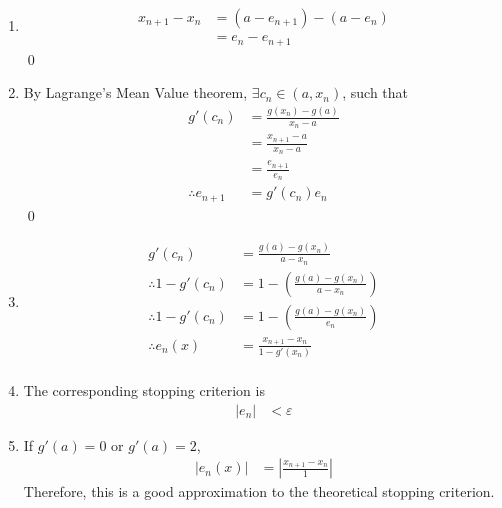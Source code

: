 \documentclass[fleqn, a4paper, 11pt, oneside]{amsart}
\theoremstyle{definition}
\theoremstyle{theorem}
\begin{document}
\begin{solution}
	\begin{enumerate}[leftmargin=*]
		\item
			\begin{align*}
				x_{n + 1} - x_n & = (a - e_{n + 1}) - (a - e_n) \\
                                                & = e_n - e_{n + 1}
			\end{align*}
			\qed
		\item
			By Lagrange's Mean Value theorem, $\exists c_n \in (a,x_n)$, such that
			\begin{align*}
				g'(c_n)              & = \frac{g(x_n) - g(a)}{x_n - a} \\
                                                     & = \frac{x_{n + 1} - a}{x_n - a} \\
                                                     & = \frac{e_{n + 1}}{e_n}         \\
				\therefore e_{n + 1} & = g'(c_n) e_n
			\end{align*}
			\qed
		\item
			\begin{align*}
				g'(c_n)                & = \frac{g(a) - g(x_n)}{a - x_n}                    \\
				\therefore 1 - g'(c_n) & = 1 - \left( \frac{g(a) - g(x_n)}{a - x_n} \right) \\
				\therefore 1 - g'(c_n) & = 1 - \left( \frac{g(a) - g(x_n)}{e_n} \right)     \\
				\therefore e_n(x)      & = \frac{x_{n + 1} - x_n}{1 - g'(x_n)}              \\
			\end{align*}
		\item
			The corresponding stopping criterion is
			\begin{align*}
				|e_n| & < \varepsilon
			\end{align*}
		\item
			If $g'(a) = 0$ or $g'(a) = 2$,
			\begin{align*}
				\left| e_n(x) \right| & = \left| \frac{x_{n + 1} - x_n}{1} \right|
			\end{align*}
			Therefore, this is a good approximation to the theoretical stopping criterion.
	\end{enumerate}
\end{solution}
\end{document}
